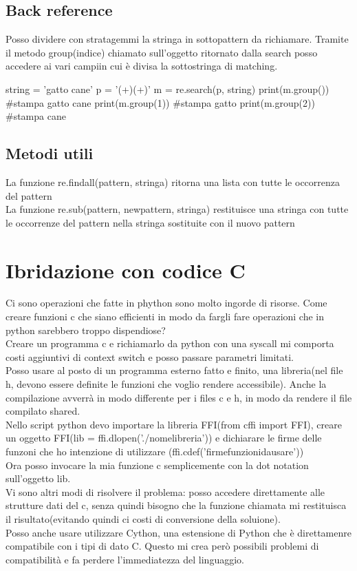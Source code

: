 \section{Back reference}
Posso dividere con stratagemmi la stringa in sottopattern da richiamare. Tramite il metodo group(indice) chiamato sull'oggetto ritornato dalla search posso accedere ai vari campiin cui è divisa la sottostringa di matching.

\begin{py}
string = 'gatto cane'
p = '(\w+)\s(\w+)'
m = re.search(p, string)
print(m.group())
#stampa gatto cane
print(m.group(1))
#stampa gatto
print(m.group(2))
#stampa cane
\end{py}

\section{Metodi utili}
La funzione re.findall(pattern, stringa) ritorna una lista con tutte le occorrenza del pattern\\
La funzione re.sub(pattern, newpattern, stringa) restituisce una stringa con tutte le occorrenze del pattern nella stringa sostituite con il nuovo pattern

\chapter{Ibridazione con codice C} 
Ci sono operazioni che fatte in phython sono molto ingorde di risorse.
Come creare funzioni c che siano efficienti in modo da fargli fare operazioni che in python sarebbero troppo dispendiose?\\
Creare un programma c e richiamarlo da python con una syscall mi comporta costi aggiuntivi di context switch e posso passare parametri limitati.\\
Posso usare al posto di un programma esterno fatto e finito, una libreria(nel file h, devono essere definite le funzioni che voglio rendere accessibile). Anche la compilazione avverrà in modo differente per i files c e h, in modo da rendere il file compilato shared.\\
Nello script python devo importare la libreria FFI(from cffi import FFI), creare un oggetto FFI(lib = ffi.dlopen('./nomelibreria')) e dichiarare le firme delle funzoni che ho intenzione di utilizzare (ffi.cdef('firmefunzionidausare'))\\
Ora posso invocare la mia funzione c semplicemente con la dot notation sull'oggetto lib.\\
Vi sono altri modi di risolvere il problema: posso accedere direttamente alle strutture dati del c, senza quindi bisogno che la funzione chiamata mi restituisca il risultato(evitando quindi ci costi di conversione della soluione).\\
Posso anche usare utilizzare Cython, una estensione di Python che è direttamenre compatibile con i tipi di dato C. Questo mi crea però possibili problemi di compatibilità e fa perdere l'immediatezza del linguaggio. 

